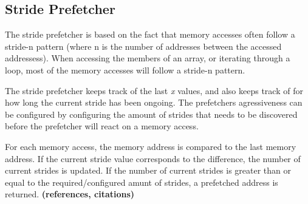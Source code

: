 \subsection{Stride Prefetcher}
\label{sec:stridePrefetcher}
The stride prefetcher is based on the fact that memory accesses
often follow a stride-n pattern (where n is the number of addresses between
the accessed addressess). When accessing the members of an
array, or iterating through a loop, most of the memory accesses will
follow a stride-n pattern.

The stride prefetcher keeps track of the last \emph{x} values, and
also keeps track of for how long the current stride has been
ongoing. The prefetchers agressiveness can be configured by
configuring the amount of strides that needs to be discovered before
the prefetcher will react on a memory access.

For each memory access, the memory address is compared to the last
memory address. If the current stride value corresponds to the
difference, the number of current strides is updated. If the number of
current strides is greater than or equal to the required/configured
amunt of strides, a prefetched address is returned.  {\bf (references,
  citations)}
